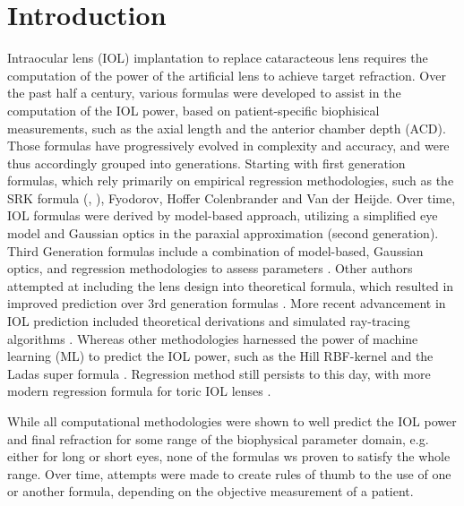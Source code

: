 \documentclass[article,twocolumn,preprint,10pt]{paper}%
\renewcommand{\(}{\left(}
\renewcommand{\)}{\right)}
\renewcommand{\[}{\left[}
\renewcommand{\]}{\right]}
\newcommand{\1}{\mbox{\boldmath$1$}}
\begin{document}
\section{Introduction}\label{section:introduction}
Intraocular lens (IOL) implantation to replace cataracteous lens requires the computation of the power of the artificial lens to achieve target refraction. Over the past half a century, various formulas were developed to assist in the computation of the IOL power, based on patient-specific biophisical measurements, such as the axial length and the anterior chamber depth (ACD). Those formulas have progressively evolved in complexity and accuracy, and were thus accordingly grouped into generations. Starting with first generation formulas, which rely primarily on empirical regression methodologies, such as the SRK formula (\cite{retzlaff1990}, \cite{sanders1980}), Fyodorov, Hoffer Colenbrander and Van der Heijde.  Over time, IOL formulas were derived by model-based approach, utilizing a simplified eye model and Gaussian optics in the paraxial approximation \cite{retzlaff1990, Haigis, Olsen} \cite{Barrett-1,Barrett-2} (second generation). Third Generation formulas include a combination of model-based, Gaussian optics, and regression methodologies to assess parameters \cite{retzlaff1990}. Other authors attempted at including the lens design into theoretical formula, which resulted in improved prediction over 3rd generation formulas \cite{naeser1997}. More recent advancement in IOL prediction included theoretical derivations and simulated ray-tracing algorithms \cite{Okulix}. Whereas other methodologies harnessed the power of machine learning (ML) to predict the IOL power, such as the Hill RBF-kernel \cite{} and the Ladas super formula \cite{ladas2015}. Regression method still persists to this day, with more modern regression formula for toric IOL lenses \cite{abulafia2016}.

While all computational methodologies were shown to well predict the IOL power and final refraction for some range of the biophysical parameter domain, e.g. either for long or short eyes, none of the formulas ws proven to satisfy the whole range. Over time, attempts were made to create rules of thumb to the use of one or another formula, depending on the objective measurement of a patient. 
\end{document}
